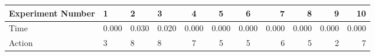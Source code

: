 \documentclass[8pt]{article}
\begin{document}
\begin{landscape}
\begin{tabular}{ | l | l | l | l | c | c | c | r | r | r | r | }
 \hline 
Experiment Number & 1 & 2 & 3 & 4 & 5 & 6 & 7 & 8 & 9 & 10\\ \hline
Time & 0.000 & 0.030 & 0.020 & 0.000 & 0.000 & 0.000 & 0.000 & 0.000 & 0.000 & 0.000\\ \hline
Action & 3 & 8 & 8 & 7 & 5 & 5 & 6 & 5 & 2 & 7\\ \hline\end{tabular}
\end{landscape}
\end{document}
